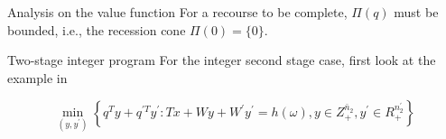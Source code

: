 \documentclass{beamerswitch}
\theoremstyle{definition}
\begin{document}
\begin{frame}[allowframebreaks]{Analysis on the value function}
    For a recourse to be complete, \(\Pi(q)\) must be bounded, i.e., the recession cone \(\Pi(0) = \{0\}\).

\end{frame}
\begin{frame}[allowframebreaks]{Two-stage integer program}
    For the integer second stage case, first look at the example in \cite{schultz_stochastic_2003}

    \[
        \min _{\left(y, y^{\prime}\right)}\left\{q^{T} y+q^{\prime T} y^{\prime}: T x+W y+W^{\prime} y^{\prime}=h(\omega), y \in Z _{+}^{\bar{n}_{2}}, y^{\prime} \in R _{+}^{n_{2}^{\prime}}\right\}
    \]
\end{frame}
\begin{frame}[allowframebreaks]
    
    
\end{frame}
\end{document}
